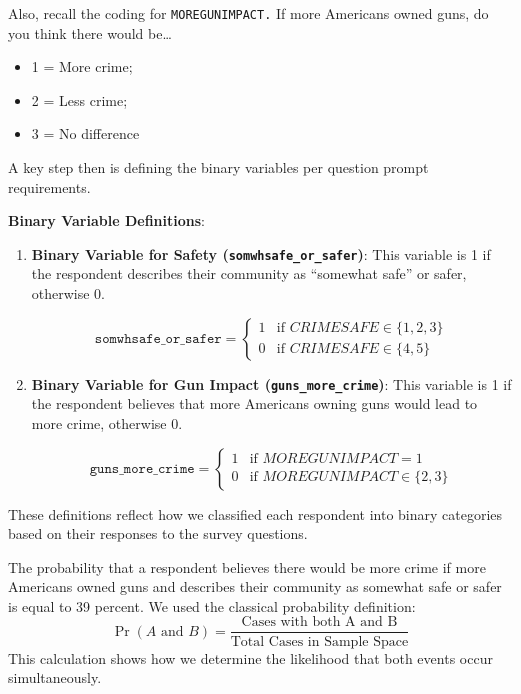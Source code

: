 \documentclass[
  11pt,
]{article}
\providecommand{\tightlist}{%
  \setlength{\itemsep}{0pt}\setlength{\parskip}{0pt}}
\begin{document}
Also, recall the coding for \texttt{MOREGUNIMPACT.} If more Americans
owned guns, do you think there would be\ldots{}

\begin{itemize}
\tightlist
\item
  1 = More crime;
\item
  2 = Less crime;
\item
  3 = No difference
\end{itemize}

A key step then is defining the binary variables per question prompt
requirements.

\textbf{Binary Variable Definitions}:

\begin{enumerate}
\def\labelenumi{\arabic{enumi}.}
\item
  \textbf{Binary Variable for Safety (\texttt{somwhsafe\_or\_safer})}:
  This variable is 1 if the respondent describes their community as
  ``somewhat safe'' or safer, otherwise 0.

  \[ 
  \texttt{somwhsafe\_or\_safer} = 
  \begin{cases} 
     1 & \text{if } CRIMESAFE \in \{1, 2, 3\} \\
     0 & \text{if } CRIMESAFE \in \{4, 5\}
  \end{cases}
  \]
\item
  \textbf{Binary Variable for Gun Impact (\texttt{guns\_more\_crime})}:
  This variable is 1 if the respondent believes that more Americans
  owning guns would lead to more crime, otherwise 0.

  \[ 
  \texttt{guns\_more\_crime} = 
  \begin{cases} 
     1 & \text{if } MOREGUNIMPACT = 1 \\
     0 & \text{if } MOREGUNIMPACT \in \{2, 3\}
  \end{cases}
  \]
\end{enumerate}

These definitions reflect how we classified each respondent into binary
categories based on their responses to the survey questions.

The probability that a respondent believes there would be more crime if
more Americans owned guns and describes their community as somewhat safe
or safer is equal to 39 percent. We used the classical probability
definition:
\[\Pr(A\text{ and }B) = \frac{\text{Cases with both A and B}}{\text{Total Cases in Sample Space}}\]
This calculation shows how we determine the likelihood that both events
occur simultaneously.
\end{document}
